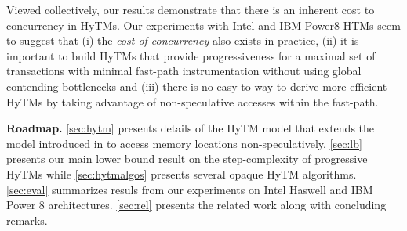 Viewed collectively, our results demonstrate that there is an inherent cost to concurrency in HyTMs.
Our experiments with Intel and IBM Power8 HTMs   
seem to suggest that (i) the \emph{cost of concurrency} also exists in practice, (ii) it is important to build HyTMs that provide progressiveness for a maximal set of transactions with minimal fast-path instrumentation
without using global contending bottlenecks and (iii) there is no easy to way to derive more efficient HyTMs by taking advantage of non-speculative accesses within the fast-path.


\vspace{1mm}\noindent\textbf{Roadmap.}
\cref{sec:hytm} presents details of the HyTM model that extends the model introduced in \cite{htmdisc15} 
to access memory locations non-speculatively.
\cref{sec:lb} presents our main lower bound result on the step-complexity of progressive HyTMs
while \cref{sec:hytmalgos} presents several opaque HyTM algorithms.
\cref{sec:eval} summarizes resuls from our experiments on Intel Haswell and IBM Power 8 architectures.
\cref{sec:rel} presents the related work along with concluding remarks.
%
